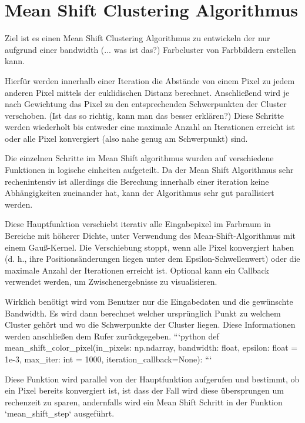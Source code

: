 \section{Mean Shift Clustering Algorithmus}

Ziel ist es einen Mean Shift Clustering Algorithmus zu entwickeln der nur aufgrund einer bandwidth (... was ist das?) Farbcluster von Farbbildern erstellen kann.

Hierfür werden innerhalb einer Iteration die Abstände von einem Pixel zu jedem anderen Pixel mittels der euklidischen Distanz berechnet. Anschließend wird je nach Gewichtung das Pixel zu den entsprechenden Schwerpunkten der Cluster verschoben. (Ist das so richtig, kann man das besser erklären?) Diese Schritte werden wiederholt bis entweder eine maximale Anzahl an Iterationen erreicht ist oder alle Pixel konvergiert (also nahe genug am Schwerpunkt) sind.





Die einzelnen Schritte im Mean Shift algorithmus wurden auf verschiedene Funktionen in logische einheiten aufgeteilt. Da der Mean Shift Algorithmus sehr rechenintensiv ist allerdings die Berechung innerhalb einer iteration keine Abhängigkeiten zueinander hat, kann der Algorithmus sehr gut parallisiert werden.


Diese Hauptfunktion verschiebt iterativ alle Eingabepixel im Farbraum in Bereiche mit höherer Dichte,
unter Verwendung des Mean-Shift-Algorithmus mit einem Gauß-Kernel. Die Verschiebung stoppt, wenn alle Pixel
konvergiert haben (d. h., ihre Positionsänderungen liegen unter dem Epsilon-Schwellenwert) oder die maximale Anzahl
der Iterationen erreicht ist. Optional kann ein Callback verwendet werden, um Zwischenergebnisse zu visualisieren.

Wirklich benötigt wird vom Benutzer nur die Eingabedaten und die gewünschte Bandwidth. Es wird dann berechnet welcher ursprünglich Punkt zu welchem Cluster gehört und wo die Schwerpunkte der Cluster liegen. Diese Informationen werden anschließen dem Rufer zurückgegeben.
```python
def mean_shift_color_pixel(in_pixels: np.ndarray, bandwidth: float, epsilon: float = 1e-3, max_iter: int = 1000, iteration_callback=None):
```


Diese Funktion wird parallel von der Hauptfunktion aufgerufen und bestimmt, ob ein Pixel bereits konvergiert ist, ist dass der Fall wird diese übersprungen um rechenzeit zu sparen, andernfalls wird ein Mean Shift Schritt in der Funktion `mean_shift_step` ausgeführt.

